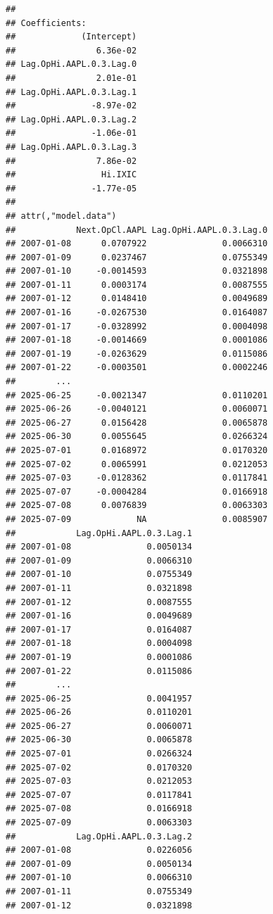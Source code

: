 \documentclass[]{ctexbook}
\begin{document}
\begin{verbatim}
## 
## Coefficients:
##             (Intercept)  
##                6.36e-02  
## Lag.OpHi.AAPL.0.3.Lag.0  
##                2.01e-01  
## Lag.OpHi.AAPL.0.3.Lag.1  
##               -8.97e-02  
## Lag.OpHi.AAPL.0.3.Lag.2  
##               -1.06e-01  
## Lag.OpHi.AAPL.0.3.Lag.3  
##                7.86e-02  
##                 Hi.IXIC  
##               -1.77e-05  
## 
## attr(,"model.data")
##            Next.OpCl.AAPL Lag.OpHi.AAPL.0.3.Lag.0
## 2007-01-08      0.0707922               0.0066310
## 2007-01-09      0.0237467               0.0755349
## 2007-01-10     -0.0014593               0.0321898
## 2007-01-11      0.0003174               0.0087555
## 2007-01-12      0.0148410               0.0049689
## 2007-01-16     -0.0267530               0.0164087
## 2007-01-17     -0.0328992               0.0004098
## 2007-01-18     -0.0014669               0.0001086
## 2007-01-19     -0.0263629               0.0115086
## 2007-01-22     -0.0003501               0.0002246
##        ...                                       
## 2025-06-25     -0.0021347               0.0110201
## 2025-06-26     -0.0040121               0.0060071
## 2025-06-27      0.0156428               0.0065878
## 2025-06-30      0.0055645               0.0266324
## 2025-07-01      0.0168972               0.0170320
## 2025-07-02      0.0065991               0.0212053
## 2025-07-03     -0.0128362               0.0117841
## 2025-07-07     -0.0004284               0.0166918
## 2025-07-08      0.0076839               0.0063303
## 2025-07-09             NA               0.0085907
##            Lag.OpHi.AAPL.0.3.Lag.1
## 2007-01-08               0.0050134
## 2007-01-09               0.0066310
## 2007-01-10               0.0755349
## 2007-01-11               0.0321898
## 2007-01-12               0.0087555
## 2007-01-16               0.0049689
## 2007-01-17               0.0164087
## 2007-01-18               0.0004098
## 2007-01-19               0.0001086
## 2007-01-22               0.0115086
##        ...                        
## 2025-06-25               0.0041957
## 2025-06-26               0.0110201
## 2025-06-27               0.0060071
## 2025-06-30               0.0065878
## 2025-07-01               0.0266324
## 2025-07-02               0.0170320
## 2025-07-03               0.0212053
## 2025-07-07               0.0117841
## 2025-07-08               0.0166918
## 2025-07-09               0.0063303
##            Lag.OpHi.AAPL.0.3.Lag.2
## 2007-01-08               0.0226056
## 2007-01-09               0.0050134
## 2007-01-10               0.0066310
## 2007-01-11               0.0755349
## 2007-01-12               0.0321898

\end{verbatim}
\end{document}
